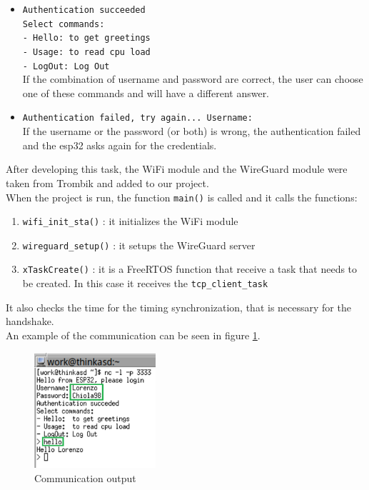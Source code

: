 \begin{itemize}
\begin{itemize}
        \item \texttt{Authentication succeeded\\
         Select commands:\\
        - Hello:  to get greetings\\
        - Usage:  to read cpu load\\
        - LogOut: Log Out}\\
        If the combination of username and password are correct, the user can choose one of these commands and will have a different answer.\\
        \item \texttt{Authentication failed, try again...  Username: }\\
        If the username or the password (or both) is wrong, the authentication failed and the esp32 asks again for the credentials.
    \end{itemize}
    
\end{itemize}
After developing this task, the WiFi module and the WireGuard module were taken from Trombik\cite{wg_trombik} and added to our project.\\
When the project is run, the function \texttt{main()} is called and it calls the functions:
\begin{enumerate}
    \item \texttt{wifi\_init\_sta()} : it initializes the WiFi module
    \item \texttt{wireguard\_setup()} : it setups the WireGuard server
    \item \texttt{xTaskCreate()} : it is a FreeRTOS function that receive a task that needs to be created. In this case it receives the \texttt{tcp\_client\_task}
\end{enumerate}
It also checks the time for the timing synchronization, that is necessary for the handshake.
\\An example of the communication can be seen in figure \ref{fig:communicationEx}.
    
\begin{figure}[H]
    \centering
    \vspace{0.35cm}
    \includegraphics[width=0.4\textwidth]{images/communicationEx.png}
    \caption{Communication output}
    \label{fig:communicationEx} %
\end{figure}


